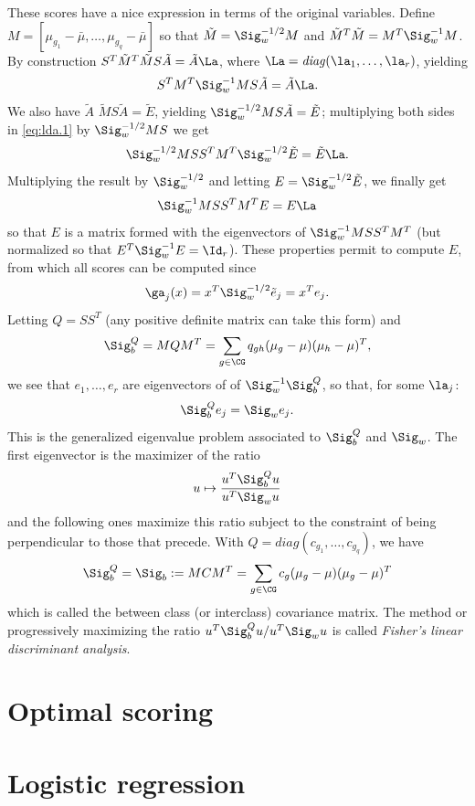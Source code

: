 These scores have a nice expression in terms of the original
variables. Define $M = [\mu_{g_1} - \bar\mu, \ldots, \mu_{g_q}-
\bar\mu]$ so that $\tilde M = \Sig_w^{-1/2} M$ and $\tilde M^T \tilde
M = M^T \Sig_w^{-1} M$. By construction
$S^T\tilde M^T\tilde M S\tilde A = \tilde A \La$, where $\La =
\mathit{diag}(\la_1, \ldots, \la_r)$,  yielding
\begin{equation}
\label{eq:lda.1} 
S^TM^T \Sig_w^{-1} MS \tilde A= \tilde A \La. 
\end{equation}
We also have $\tilde A$ $\tilde MS\tilde A = \tilde E$, yielding
$\Sig_w^{-1/2} MS\tilde A = \tilde E$; multiplying both sides in
\eqref{eq:lda.1} by $\Sig_w^{-1/2}MS$ we get
$$
\Sig_w^{-1/2} MSS^TM^T \Sig_w^{-1/2} \tilde E = \tilde E \La.
$$ 
Multiplying the result by $\Sig_w^{-1/2}$ and letting $ E =
\Sig_w^{-1/2} \tilde E$, we finally get
$$
\Sig_w^{-1} MSS^TM^T E = E \La
$$
so that $E$ is a matrix formed with the eigenvectors of $\Sig_w^{-1}
MSS^TM^T $ (but normalized so that $E^T\Sig_w^{-1} E = \Id_r$).
These properties permit to compute $E$, from which all scores can be
computed since
$$
\ga_j(x) = x^T \Sig_w^{-1/2} \tilde e_j = x^T e_j.
$$
Letting $Q = SS^T$ (any positive definite matrix can take this form)
and 
$$
\Sig_b^Q = MQM^T = \sum_{g\in\CG} q_{gh} (\mu_g-\mu) (\mu_h-\mu)^T, 
$$
we see that $e_1, \ldots, e_r$ are eigenvectors of of $\Sig_w^{-1}
\Sig_b^Q$, so that, for some $\la_j$:
$$
\Sig_b^Q e_j = \Sig_w e_j.
$$
This is the generalized eigenvalue problem associated to $\Sig_b^Q$
and $\Sig_w$. The first eigenvector is the maximizer of the ratio
$$
u\mapsto \frac{u^T\Sig_b^Q u}{u^T\Sig_w u}
$$
and the following ones maximize this ratio subject to the constraint of
being perpendicular to those that precede. With $Q =
\mathit{diag}(c_{g_1}, \ldots, c_{g_q})$, we have
$$
\Sig_b^Q = \Sig_b := MCM^T  = \sum_{g\in \CG} c_g (\mu_g-\mu)
(\mu_g-\mu)^T
$$
which is called the between class (or interclass) covariance
matrix. The method or progressively maximizing the ratio 
${u^T\Sig_b^Q u}/{u^T\Sig_w u}$ is called {\em Fisher's linear
  discriminant analysis}. 

\section{Optimal scoring}

\section{Logistic regression} 

